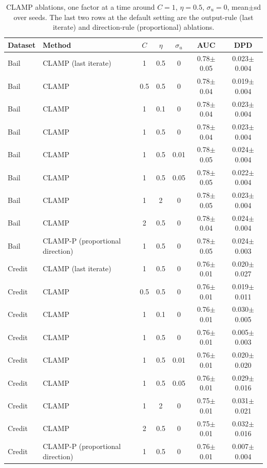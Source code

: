 \begin{table}[tbp]
\centering
\footnotesize
\caption{CLAMP ablations, one factor at a time around $C=1$, $\eta=0.5$, $\sigma_u=0$, mean$\pm$sd over seeds. The last two rows at the default setting are the output-rule (last iterate) and direction-rule (proportional) ablations.}
\label{tab:e6_ablation}
\setlength{\tabcolsep}{3pt}
\begin{tabular}{lp{3.6cm}ccccc}
\toprule
Dataset & Method & $C$ & $\eta$ & $\sigma_u$ & AUC & DPD \\
\midrule
Bail & CLAMP (last iterate) & 1 & 0.5 & 0 & 0.78$\pm$0.05 & 0.023$\pm$0.004 \\
Bail & CLAMP & 0.5 & 0.5 & 0 & 0.78$\pm$0.04 & 0.019$\pm$0.004 \\
Bail & CLAMP & 1 & 0.1 & 0 & 0.78$\pm$0.04 & 0.023$\pm$0.004 \\
Bail & CLAMP & 1 & 0.5 & 0 & 0.78$\pm$0.04 & 0.023$\pm$0.004 \\
Bail & CLAMP & 1 & 0.5 & 0.01 & 0.78$\pm$0.05 & 0.024$\pm$0.004 \\
Bail & CLAMP & 1 & 0.5 & 0.05 & 0.78$\pm$0.05 & 0.022$\pm$0.004 \\
Bail & CLAMP & 1 & 2 & 0 & 0.78$\pm$0.05 & 0.023$\pm$0.004 \\
Bail & CLAMP & 2 & 0.5 & 0 & 0.78$\pm$0.04 & 0.024$\pm$0.004 \\
Bail & CLAMP-P (proportional direction) & 1 & 0.5 & 0 & 0.78$\pm$0.05 & 0.024$\pm$0.003 \\
Credit & CLAMP (last iterate) & 1 & 0.5 & 0 & 0.76$\pm$0.01 & 0.020$\pm$0.027 \\
Credit & CLAMP & 0.5 & 0.5 & 0 & 0.76$\pm$0.01 & 0.019$\pm$0.011 \\
Credit & CLAMP & 1 & 0.1 & 0 & 0.76$\pm$0.01 & 0.030$\pm$0.005 \\
Credit & CLAMP & 1 & 0.5 & 0 & 0.76$\pm$0.01 & 0.005$\pm$0.003 \\
Credit & CLAMP & 1 & 0.5 & 0.01 & 0.76$\pm$0.01 & 0.020$\pm$0.020 \\
Credit & CLAMP & 1 & 0.5 & 0.05 & 0.76$\pm$0.01 & 0.029$\pm$0.016 \\
Credit & CLAMP & 1 & 2 & 0 & 0.75$\pm$0.01 & 0.031$\pm$0.021 \\
Credit & CLAMP & 2 & 0.5 & 0 & 0.75$\pm$0.01 & 0.032$\pm$0.016 \\
Credit & CLAMP-P (proportional direction) & 1 & 0.5 & 0 & 0.76$\pm$0.01 & 0.007$\pm$0.004 \\
\bottomrule
\end{tabular}
\end{table}
